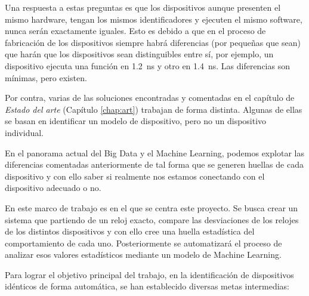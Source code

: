 Una respuesta a estas preguntas es que los dispositivos aunque presenten el mismo hardware, tengan los mismos identificadores y ejecuten el mismo software, nunca serán exactamente iguales. Esto es debido a que en el proceso de fabricación de los dispositivos siempre habrá diferencias (por pequeñas que sean) que harán que los dispositivos sean distinguibles entre sí, por ejemplo, un dispositivo ejecuta una función en \SI{1.2}{\nano\second} y otro en \SI{1.4}{\nano\second}. Las diferencias son mínimas, pero existen.

Por contra, varias de las soluciones encontradas y comentadas en el capítulo de \textit{Estado del arte} (Capítulo \ref{chap:art}) trabajan de forma distinta. Algunas de ellas se basan en identificar un modelo de dispositivo, pero no un dispositivo individual.

En el panorama actual del Big Data y el Machine Learning, podemos explotar las diferencias comentadas anteriormente de tal forma que se generen huellas de cada dispositivo y con ello saber si realmente nos estamos conectando con el dispositivo adecuado o no.

En este marco de trabajo es en el que se centra este proyecto. Se busca crear un sistema que partiendo de un reloj exacto, compare las desviaciones de los relojes de los distintos dispositivos y con ello cree una huella estadística del comportamiento de cada uno. Posteriormente se automatizará el proceso de analizar esos valores estadísticos mediante un modelo de Machine Learning.

Para lograr el objetivo principal del trabajo, en la identificación de dispositivos idénticos de forma automática, se han establecido diversas metas intermedias:

